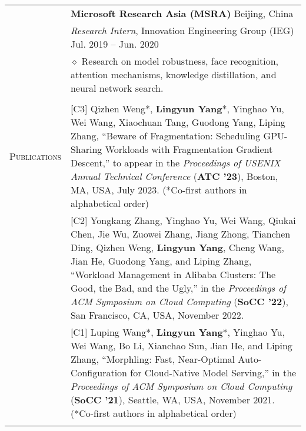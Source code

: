 \documentclass[letterpaper, 11pt]{article}
\begin{document}
\begin{longtable}{p{1in}p{5in}}
& {\textbf{Microsoft Research Asia (MSRA)}} \hfill Beijing, China\\
& \textit{Research Intern}, Innovation Engineering Group (IEG) \hfill Jul. 2019 -- Jun. 2020 \\
& $\diamond$ Research on model robustness, face recognition, attention mechanisms, knowledge distillation, and neural network search. \\
& \\

\nohyphens{\textsc{Publications}}

& [C3] Qizhen Weng*, \textbf{Lingyun Yang}*, Yinghao Yu, Wei Wang, Xiaochuan Tang, Guodong Yang, Liping Zhang, “Beware of Fragmentation: Scheduling GPU-Sharing Workloads with Fragmentation Gradient Descent,” to appear in the \textit{Proceedings of USENIX Annual Technical Conference} (\textbf{ATC '23}), Boston, MA, USA, July 2023. (*Co-first authors in alphabetical order) \\
& [C2] Yongkang Zhang, Yinghao Yu, Wei Wang, Qiukai Chen, Jie Wu, Zuowei Zhang, Jiang Zhong, Tianchen Ding, Qizhen Weng, \textbf{Lingyun Yang}, Cheng Wang, Jian He, Guodong Yang, and Liping Zhang, “Workload Management in Alibaba Clusters: The Good, the Bad, and the Ugly,” in the \textit{Proceedings of ACM Symposium on Cloud Computing} (\textbf{SoCC '22}), San Francisco, CA, USA, November 2022. \\
& [C1] Luping Wang*, \textbf{Lingyun Yang}*, Yinghao Yu, Wei Wang, Bo Li, Xianchao Sun, Jian He, and Liping Zhang, “Morphling: Fast, Near-Optimal Auto-Configuration for Cloud-Native Model Serving,” in the \textit{Proceedings of ACM Symposium on Cloud Computing} (\textbf{SoCC '21}), Seattle, WA, USA, November 2021. (*Co-first authors in alphabetical order) \\
& \\


\end{longtable}
\end{document}
